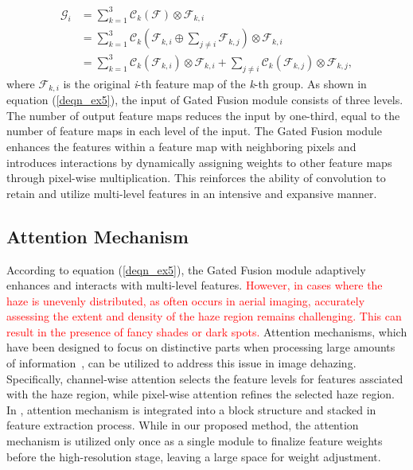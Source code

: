 \documentclass[lettersize,journal]{IEEEtran}
\begin{document}
\begin{equation}
    \label{deqn_ex5}
    \begin{aligned}
        \mathcal{G}_i &= \sum_{k=1}^3 \mathcal{C}_k(\mathcal{F}) \otimes \mathcal{F}_{k,i}\\
        &= \sum_{k=1}^3 \mathcal{C}_k(\mathcal{F}_{k,i} \oplus \sum_{j \neq i} \mathcal{F}_{k,j}) \otimes \mathcal{F}_{k,i}\\
        &= \sum_{k=1}^3 \mathcal{C}_k(\mathcal{F}_{k,i}) \otimes \mathcal{F}_{k,i} + \sum_{j \neq i} \mathcal{C}_k(\mathcal{F}_{k,j}) \otimes \mathcal{F}_{k,j},
    \end{aligned}
\end{equation}
where $\mathcal{F}_{k,i}$ is the original \textit{i}-th feature map of the \textit{k}-th group. As shown in equation (\ref{deqn_ex5}), the input of Gated Fusion module consists of three levels. The number of output feature maps reduces the input by one-third, equal to the number of feature maps in each level of the input. The Gated Fusion module enhances the features within a feature map with neighboring pixels and introduces interactions by dynamically assigning weights to other feature maps through pixel-wise multiplication. This reinforces the ability of convolution to retain and utilize multi-level features in an intensive and expansive manner.

\subsection{Attention Mechanism}
According to equation (\ref{deqn_ex5}), the Gated Fusion module adaptively enhances and interacts with multi-level features. \textcolor{red}{However, in cases where the haze is unevenly distributed, as often occurs in aerial imaging, accurately assessing the extent and density of the haze region remains challenging. This can result in the presence of fancy shades or dark spots.} Attention mechanisms, which have been designed to focus on distinctive parts when processing large amounts of information~\cite{niu2021review_on_attention}, can be utilized to address this issue in image dehazing. Specifically, channel-wise attention selects the feature levels for features assciated with the haze region, while pixel-wise attention refines the selected haze region. In \cite{qin2020ffa}, attention mechanism \cite{woo2018cbam} is integrated into a block structure and stacked in feature extraction process. While in our proposed method, the attention mechanism is utilized only once as a single module to finalize feature weights before the high-resolution stage, leaving a large space for weight adjustment.
\end{document}
